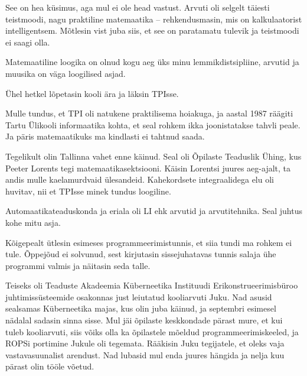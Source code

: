 See on hea küsimus, aga mul ei ole head vastust. Arvuti oli selgelt täiesti 
teistmoodi, nagu praktiline matemaatika – rehkendusmasin, mis on kalkulaatorist intelligentsem. Mõtlesin vist
juba siis, et see on paratamatu tulevik ja teistmoodi ei saagi olla. 


Matemaatiline loogika on olnud kogu aeg üks minu lemmikdistsipliine, arvutid 
ja muusika on väga loogilised asjad. 

Ühel hetkel lõpetasin kooli ära ja läksin TPIsse.


Mulle tundus, et TPI oli natukene praktilisema hoiakuga, ja aastal 
1987 räägiti Tartu Ülikooli informaatika kohta, 
et seal rohkem ikka joonistatakse tahvli peale. Ja päris matemaatikuks ma kindlasti 
ei tahtnud saada.

Tegelikult olin Tallinna vahet enne käinud. Seal oli Õpilaste 
Teaduslik Ühing, kus Peeter 
Lorents tegi matemaatikasektsiooni. Käisin 
Lorentsi juures aeg-ajalt, ta andis mulle kaelamurdvaid 
ülesandeid. Kahekordsete integraalidega 
elu oli huvitav, nii et TPIsse minek tundus loogiline.


Automaatikateaduskonda ja eriala oli
LI ehk arvutid ja 
arvutitehnika. Seal juhtus kohe mitu asja. 

Kõigepealt ütlesin esimeses programmeerimistunnis, et siia tundi ma rohkem 
ei tule. Õppejõud ei solvunud, sest kirjutasin sissejuhatavas tunnis salaja
ühe programmi valmis ja näitasin seda talle.

Teiseks oli Teaduste Akadeemia Küberneetika Instituudi 
Erikonstrueerimisbüroo juhtimissüsteemide osakonnas just
leiutatud kooliarvuti Juku. Nad asusid sealsamas Küberneetika majas, kus olin juba käinud, ja 
septembri esimesel nädalal sadasin sinna sisse. Mul jäi 
õpilaste keskkondade pärast mure, et kui tuleb kooliarvuti, siis võiks olla ka 
õpilastele mõeldud programmeerimiskeeled, ja ROPSi portimine 
Jukule oli tegemata. Rääkisin Juku tegijatele, et oleks vaja vastavasuunalist 
arendust. Nad lubasid mul enda juures hängida ja nelja kuu pärast 
olin tööle võetud. 

